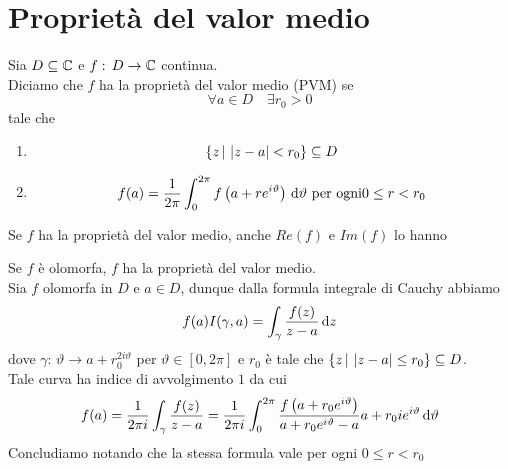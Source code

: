 \section{Propriet\`a del valor medio}
\begin{defn}Sia $D\subseteq \mathbb{C}$ e $f:\, D \to \mathbb{C}$ continua.\\
Diciamo che $f$ ha la propriet\`a del valor medio (PVM) se 
$$\forall a\in D \quad \exists r_0 >0$$ 
tale che 
\begin{enumerate}
\item $$\{z\, \vert \, \left\vert z-a \right\vert < r_0\} \subseteq D$$
\item $$f(a) = \frac{1}{2\pi} \int_0^{2\pi} f\left(  a+re^{i\vartheta} \right) \, \mathrm{d} \vartheta\text{ per ogni} 0\leq r<r_0$$
\end{enumerate}
\end{defn}
\begin{oss}Se $f$ ha la propriet\`a del valor medio, anche $Re(f)$ e $Im(f)$ lo hanno 
\end{oss}
\begin{oss}Se $f$ \`e olomorfa, $f$ ha la propriet\`a del valor medio.\\
Sia $f$ olomorfa in $D$ e $a\in D$, dunque  dalla formula integrale di Cauchy abbiamo 
$$f(a) I(\gamma,a) = \int_\gamma \frac{f(z)}{z-a} \, \mathrm{d}z$$
dove $\gamma:\, \vartheta \to a +r_0^{2i \vartheta }$ per $\vartheta \in [0,2\pi]$ e  $r_0$ \`e tale che $\{ z\, \vert \, \left\vert z-a \right\vert \leq r_0\}\subseteq D$. \\
Tale curva ha indice di avvolgimento $1$ da cui 
$$ f(a) = \frac{1}{2\pi i } \int_\gamma \frac{f(z)}{z-a} =\frac{1}{2\pi i }\int_0^{2\pi} \frac{f\left( a+r_0e^{i\vartheta} \right)}{a+r_0e^{i\vartheta} -a } a+r_0i e^{i\vartheta} \, \mathrm{d} \vartheta$$
Concludiamo notando che la stessa formula vale per ogni $0\leq r< r_0$
\end{oss}
